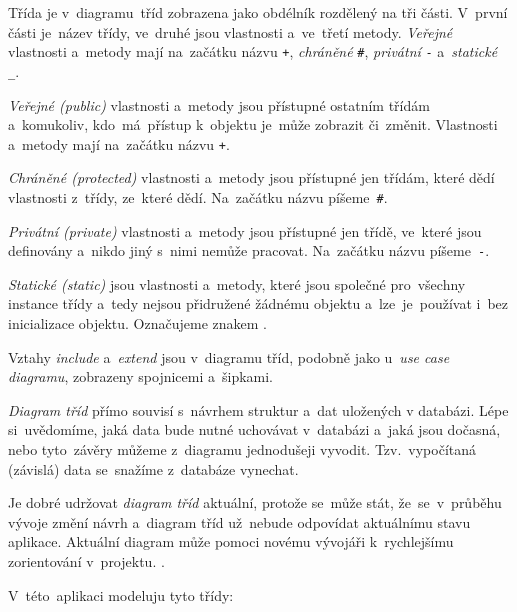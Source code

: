 \documentclass[10pt,a4paper]{article}
\begin{document}
                Třída je v~diagramu~tříd zobrazena jako obdélník rozdělený na tři části. V~první části je~název třídy, ve~druhé jsou vlastnosti a~ve~třetí metody. \emph{Veřejné} vlastnosti a~metody mají na~začátku názvu \texttt{+}, \emph{chráněné} \texttt{\#}, \emph{privátní} \texttt{-} a~\emph{statické} \texttt{\_}.
                
                \emph{Veřejné (public)} vlastnosti a~metody jsou přístupné ostatním třídám a~komukoliv, kdo~má~přístup k~objektu je~může zobrazit či~změnit. Vlastnosti a~metody mají na~začátku názvu \texttt{+}.

                \emph{Chráněné (protected)} vlastnosti a~metody jsou přístupné jen třídám, které dědí vlastnosti z~třídy, ze~které dědí. Na~začátku názvu píšeme~\texttt{\#}.
                
                \emph{Privátní (private)} vlastnosti a~metody jsou přístupné jen třídě, ve~které jsou definovány a~nikdo jiný s~nimi nemůže pracovat. Na~začátku názvu píšeme~\texttt{-}.
                
                \emph{Statické (static)} jsou vlastnosti a~metody, které jsou společné pro~všechny instance třídy a~tedy nejsou přidružené žádnému objektu a~lze~je~používat i~bez inicializace objektu. Označujeme znakem \texttt{\textunderscore}.
                
                Vztahy \emph{include} a~\emph{extend} jsou v~diagramu tříd, podobně jako u~\emph{use case diagramu}, zobrazeny spojnicemi a~šipkami.

                \emph{Diagram tříd} přímo souvisí s~návrhem struktur a~dat uložených v databázi. Lépe si~uvědomíme, jaká data bude nutné uchovávat v~databázi a~jaká jsou dočasná, nebo tyto~závěry můžeme z~diagramu jednodušeji vyvodit. Tzv.~vypočítaná (závislá) data se~snažíme z~databáze vynechat.

                Je dobré udržovat \emph{diagram tříd} aktuální, protože se~může stát, že~se~v~průběhu vývoje změní návrh a~diagram tříd už~nebude odpovídat aktuálnímu stavu aplikace. Aktuální diagram může pomoci novému vývojáři k~rychlejšímu zorientování v~projektu. \cite{visualparadigmClassDiagram}.

                
                V~této~aplikaci modeluju tyto třídy:
\end{document}
